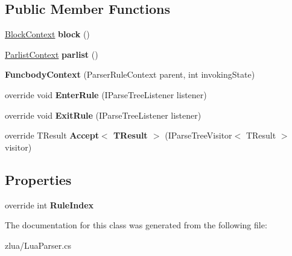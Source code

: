\subsection*{Public Member Functions}
\begin{DoxyCompactItemize}
\item 
\mbox{\label{classzlua_1_1_lua_parser_1_1_funcbody_context_a3f69ad46870981aca87d790ddaa8cd7f}} 
\mbox{\hyperlink{classzlua_1_1_lua_parser_1_1_block_context}{Block\+Context}} {\bfseries block} ()
\item 
\mbox{\label{classzlua_1_1_lua_parser_1_1_funcbody_context_a29787d86716bb5df803d4f512b93d370}} 
\mbox{\hyperlink{classzlua_1_1_lua_parser_1_1_parlist_context}{Parlist\+Context}} {\bfseries parlist} ()
\item 
\mbox{\label{classzlua_1_1_lua_parser_1_1_funcbody_context_a4154d9a6704cfe985d564910d7f5eb71}} 
{\bfseries Funcbody\+Context} (Parser\+Rule\+Context parent, int invoking\+State)
\item 
\mbox{\label{classzlua_1_1_lua_parser_1_1_funcbody_context_a54832b924cfb9091ad90c6a8167f46dd}} 
override void {\bfseries Enter\+Rule} (I\+Parse\+Tree\+Listener listener)
\item 
\mbox{\label{classzlua_1_1_lua_parser_1_1_funcbody_context_a03414364c7a6d8fa5fff2fa2fea52205}} 
override void {\bfseries Exit\+Rule} (I\+Parse\+Tree\+Listener listener)
\item 
\mbox{\label{classzlua_1_1_lua_parser_1_1_funcbody_context_a8b14cb504854f8a33c2cb6fc0c07d616}} 
override T\+Result {\bfseries Accept$<$ T\+Result $>$} (I\+Parse\+Tree\+Visitor$<$ T\+Result $>$ visitor)
\end{DoxyCompactItemize}
\subsection*{Properties}
\begin{DoxyCompactItemize}
\item 
\mbox{\label{classzlua_1_1_lua_parser_1_1_funcbody_context_ae3d9ab54c49a27356818861f9435d955}} 
override int {\bfseries Rule\+Index}
\end{DoxyCompactItemize}


The documentation for this class was generated from the following file\+:\begin{DoxyCompactItemize}
\item 
zlua/Lua\+Parser.\+cs\end{DoxyCompactItemize}
